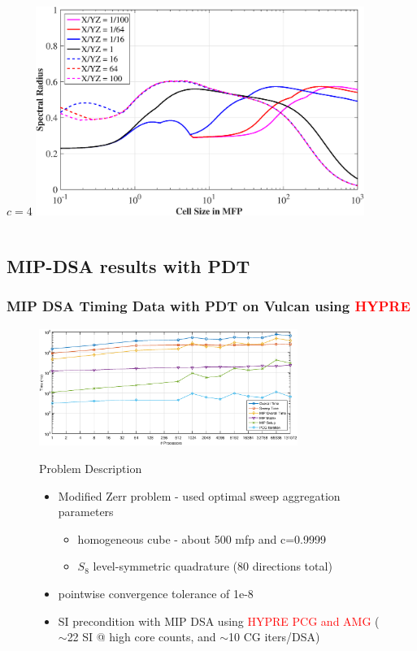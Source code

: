 \documentclass[compress,10pt]{beamer}
\newcommand{\tcr}[1]{\textcolor{red}{#1}}
\begin{document}
\begin{frame}[t]
\begin{columns}
\begin{block}{$c=4$}
{}\includegraphics[width=0.8\textwidth]{images/SI_MIP_hex_LS8_C=4_AR.eps}
\end{block}
\end{columns}
\end{frame}
\subsection{MIP-DSA results with PDT}

\begin{frame}[t]\frametitle{MIP DSA Timing Data with PDT on Vulcan using \tcr{HYPRE}}
\begin{figure}[t]
\centering
{}\includegraphics[width=0.75\textwidth]{images/Vulcan_DSA_Timing.eps}
\begin{block}{Problem Description}
	\begin{itemize}
	\item Modified Zerr problem - used optimal sweep aggregation parameters
	\begin{itemize}
	\item homogeneous cube - about 500 mfp and c=0.9999
	\item $S_8$ level-symmetric quadrature (80 directions total)
	\end{itemize}
	\item pointwise convergence tolerance of 1e-8
	\item SI precondition with MIP DSA using \tcr{HYPRE PCG and AMG} ($\sim$22 SI @ high core counts, and $\sim$10 CG iters/DSA)
	\end{itemize}
\end{block}
\end{figure}
\end{frame}
\end{document}
